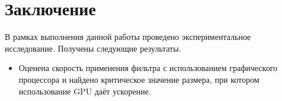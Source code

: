 
\section*{Заключение}
В рамках выполнения данной работы проведено экспериментальное исследование. Получены следующие результаты.
\begin{itemize}
    \item Оценена скорость применения фильтра с использованием графического процессора и найдено критическое значение размера, при котором использование GPU даёт ускорение.
\end{itemize}